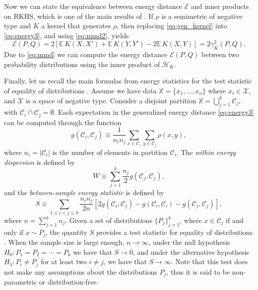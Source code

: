 \documentclass[aps,preprint,nofootinbib,floatfix]{revtex4-1}
\newcommand\Energy{\mathcal{E}}
\newcommand\E{\mathbb{E}}
\newcommand\kk{K}
\newcommand\Hk{{\mathcal{H}}_{\kk}}
\newcommand\C{{\mathcal{C}}}
\begin{document}
Now we can state the equivalence between energy distance $\Energy$ and
inner products on RKHS, which is one of the main results of
\cite{Sejdinovic2013}. If $\rho$ is a semimetric
of negative type and $\kk$ a kernel that generates $\rho$, then
replacing \eqref{eq:gen_kernel} into
\eqref{eq:energy3}, and using \eqref{eq:mmd2}, yields
\begin{equation} \label{eq:Erho}
\Energy(P, Q) = 
2 \left[ \E \, \kk(X, X') + \E \, \kk(Y, Y') - 2\E \, \kk(X, Y)\right] 
= 2 \gamma_\kk^2(P,Q) .
\end{equation}
Due to \eqref{eq:mmd} we can compute the energy 
distance $\mathcal{E}(P, Q)$ between two probability distributions
using the inner 
product of $\Hk$. 

Finally, let us recall the main formulas from energy statistics
for the test statistic of equality of distributions \cite{Szkely2013}. 
Assume we have data $\mathbb{X} = \{ x_1,\dotsc, x_n \}$ where
$x_i \in \mathcal{X}$, and $\mathcal{X}$ is a space of negative type.
Consider a disjoint partition $\mathbb{X} = \bigcup_{j=1}^k \C_j$, with
$\C_i \cap \C_j = \emptyset$.
Each expectation in the generalized energy distance
\eqref{eq:energy3}
can be computed 
through the function
\begin{equation}
\label{eq:g_def}
g (\C_i, \C_j) \equiv 
\dfrac{1}{n_i n_j}
\sum_{x \in \C_i} 
\sum_{y \in \C_j} \rho(x, y) ,
\end{equation}
where $n_i = |\C_i|$ is the number of elements in partition
$\C_i$. 
The \emph{within energy dispersion} is defined by
\begin{equation}
\label{eq:within}
W \equiv
\sum_{j=1}^{k} \dfrac{n_j}{2} g(\C_j, \C_j),
\end{equation}
and the \emph{between-sample energy statistic} is defined by
\begin{equation}
\label{eq:between}
S \equiv
\sum_{1 \le  i < j \le k } \dfrac{n_i n_{j}}{2 n} \left[
2 g(\C_i, \C_j) - 
g(\C_i, \C_i) - 
g(\C_j, \C_j)
\right],
\end{equation}
where $n = \sum_{j=1}^k n_j$.
Given a set of distributions
$\{ P_j\}_{j=1}^k$, where $x \in \C_j$ if and only if $x \sim P_j$, 
the quantity $S$ provides
a test statistic for equality of distributions
\cite{Szkely2013}.
When the sample size is large enough, $n\to \infty$,
under the null hypothesis $H_0: P_1=P_2=\dotsm=P_k$ we have that
$S\to 0$, 
and under
the alternative hypothesis $H_1: P_i \ne P_j$ for at least two $i\ne j$, 
we have that $S \to \infty$.
Note that this test does not make any assumptions
about the distributions $P_j$, thus it is said to be non-parametric or
distribution-free.
\end{document}
